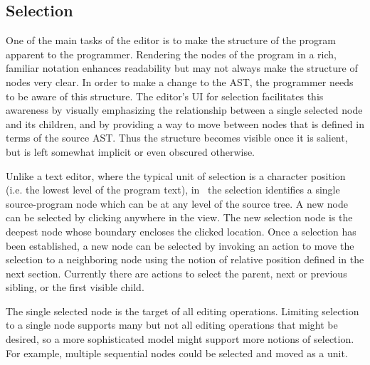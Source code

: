 

\subsection{Selection}
One of the main tasks of the editor is to make the structure of the program apparent to the programmer. Rendering the nodes of the program in a rich, familiar notation enhances readability but may not always make the structure of nodes very clear. In order to make a change to the AST, the programmer needs to be aware of this structure. The editor's UI for selection facilitates this awareness by visually emphasizing the relationship between a single selected node and its children, and by providing a way to move between nodes that is defined in terms of the source AST. Thus the structure becomes visible once it is salient, but is left somewhat implicit or even obscured otherwise.

Unlike a text editor, where the typical unit of selection is a character position (i.e. the lowest level of the program text), in \Meta\ the selection identifies a single source-program node which can be at any level of the source tree. A new node can be selected by clicking anywhere in the view. The new selection node is the deepest node whose boundary encloses the clicked location. Once a selection has been established, a new node can be selected by invoking an action to move the selection to a neighboring node using the notion of relative position defined in the next section. Currently there are actions to select the parent, next or previous sibling, or the first visible child.


The single selected node is the target of all editing operations. Limiting selection to a single node supports many but not all editing operations that might be desired, so a more sophisticated model might support more notions of selection. For example, multiple sequential nodes could be selected and moved as a unit.

